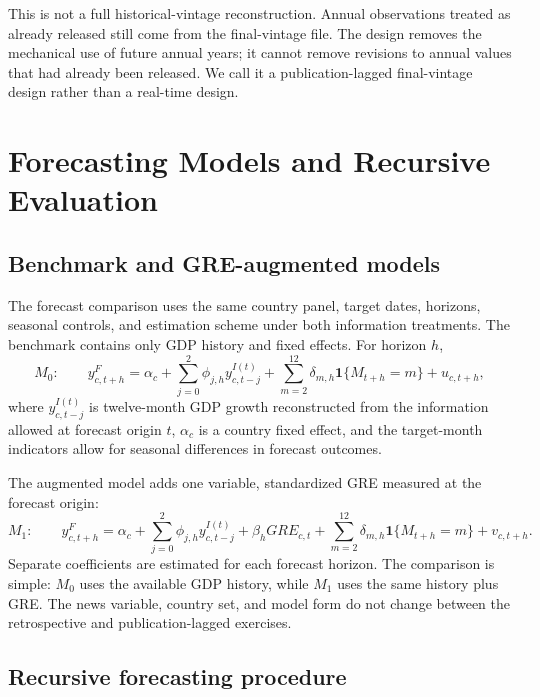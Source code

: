 \documentclass[preprint,12pt,authoryear]{elsarticle}
\begin{document}
This is not a full historical-vintage reconstruction. Annual observations treated as already released still come from the final-vintage file. The design removes the mechanical use of future annual years; it cannot remove revisions to annual values that had already been released. We call it a publication-lagged final-vintage design rather than a real-time design.

\section{Forecasting Models and Recursive Evaluation}\label{sec:forecastdesign}

\subsection{Benchmark and GRE-augmented models}

The forecast comparison uses the same country panel, target dates, horizons, seasonal controls, and estimation scheme under both information treatments. The benchmark contains only GDP history and fixed effects. For horizon $h$,
\begin{equation}
M_0:\qquad
y^F_{c,t+h}=\alpha_c+\sum_{j=0}^{2}\phi_{j,h}y^{I(t)}_{c,t-j}
+\sum_{m=2}^{12}\delta_{m,h}\mathbf{1}\{M_{t+h}=m\}+u_{c,t+h},
\label{eq:benchmark}
\end{equation}
where $y^{I(t)}_{c,t-j}$ is twelve-month GDP growth reconstructed from the information allowed at forecast origin $t$, $\alpha_c$ is a country fixed effect, and the target-month indicators allow for seasonal differences in forecast outcomes.

The augmented model adds one variable, standardized GRE measured at the forecast origin:
\begin{equation}
M_1:\qquad
y^F_{c,t+h}=\alpha_c+\sum_{j=0}^{2}\phi_{j,h}y^{I(t)}_{c,t-j}
+\beta_h GRE_{c,t}
+\sum_{m=2}^{12}\delta_{m,h}\mathbf{1}\{M_{t+h}=m\}+v_{c,t+h}.
\label{eq:augmented}
\end{equation}
Separate coefficients are estimated for each forecast horizon. The comparison is simple: $M_0$ uses the available GDP history, while $M_1$ uses the same history plus GRE. The news variable, country set, and model form do not change between the retrospective and publication-lagged exercises.

\subsection{Recursive forecasting procedure}
\end{document}
